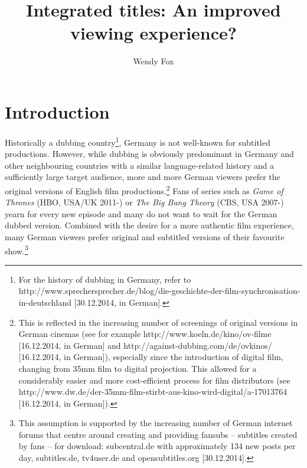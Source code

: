 \documentclass[output=paper]{langsci/langscibook}
\author{Wendy Fox\affiliation{Johannes Gutenberg University of Mainz in Germersheim}}
\title{Integrated titles: {A}n improved viewing experience?}
\begin{document}
   
\section{Introduction}

Historically a dubbing country\footnote{For the history of dubbing in Germany, refer to http://www.sprechersprecher.de/blog/die-geschichte-der-film-synchronisation-in-deutschland [30.12.2014, in German].}, 
Germany is not well-known for subtitled productions. However, while dubbing is obviously predominant in Germany and other neighbouring countries with a similar language-related history and a sufficiently large target audience, more and more German viewers prefer the original versions of English film productions.\footnote{This is reflected in the increasing number of screenings of original versions in German cinemas (see for example http://www.koeln.de/kino/ov-filme [16.12.2014, in German] and http://against-dubbing.com/de/ovkinos/ [16.12.2014, in German]), especially since the introduction of digital film, changing from 35mm film to digital projection. This allowed for a considerably easier and more cost-efficient process for film distributors (see http://www.dw.de/der-35mm-film-stirbt-aus-kino-wird-digital/a-17013764 [16.12.2014, in German]). 
} 
Fans of series such as \textit{Game of Thrones} (HBO, USA/UK 2011-) or \textit{The Big Bang Theory} (CBS, USA 2007-) yearn for every new episode and many do not want to wait for the German dubbed version. Combined with the desire for a more authentic film experience, many German viewers prefer original and subtitled versions of their favourite show.\footnote{This assumption is supported by the increasing number of German internet forums that centre around creating and providing fansubs -- subtitles created by fans -- for download: subcentral.de with approximately 134 new posts per day, subtitles.de, tv4user.de and opensubtitles.org [30.12.2014].
}
\end{document}
